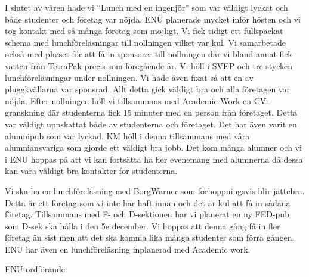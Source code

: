 \documentclass[../_main/handlingar.tex]{subfiles}
\begin{document}
I slutet av våren hade vi ``Lunch med en ingenjör'' som var väldigt lyckat och både studenter och företag var nöjda. ENU planerade mycket inför hösten och vi tog kontakt med så många företag som möjligt. Vi fick tidigt ett fullspäckat schema med lunchföreläsningar till nollningen vilket var kul. Vi samarbetade också med phøset för att få in sponsorer till nollningen där vi bland annat fick vatten från TetraPak precis som föregående år.
Vi höll i SVEP och tre stycken lunchföreläsningar under nollningen. Vi hade även fixat så att en av pluggkvällarna var sponsrad. Allt detta gick väldigt bra och alla företagen var nöjda.
Efter nollningen höll vi tillsammans med Academic Work en CV-granskning där studenterna fick 15 minuter med en person från företaget. Detta var väldigt uppskattat både av studenterna och företaget.
Det har även varit en alumnipub som var lyckad. KM höll i denna tillsammans med våra alumniansvariga som gjorde ett väldigt bra jobb. Det kom många alumner och vi i ENU hoppas på att vi kan fortsätta ha fler evenemang med alumnerna då dessa kan vara väldigt bra kontakter för studenterna.

Vi ska ha en lunchföreläsning med BorgWarner som förhoppningsvis blir jättebra. Detta är ett företag som vi inte har haft innan och det är kul att få in sådana företag.
Tillsammans med F- och D-sektionen har vi planerat en ny FED-pub som D-sek ska hålla i den 5e december. Vi hoppas att denna gång få in fler företag än sist men att det ska komma lika många studenter som förra gången.
ENU har även en lunchföreläsning inplanerad med Academic work.

\begin{signatures}{1}
	\mvh
	\signature{Isabella Hansen}{ENU-ordförande}
\end{signatures}
\end{document}
